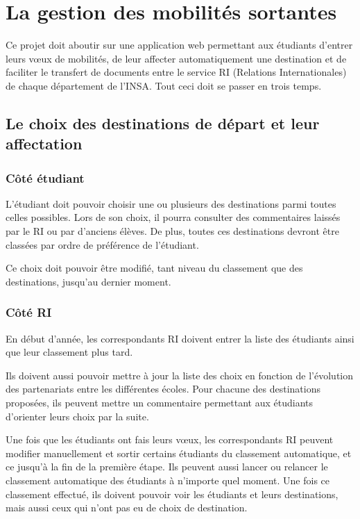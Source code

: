 
		\section{La gestion des mobilités sortantes}
		
		Ce projet doit aboutir sur une application web permettant aux étudiants d'entrer leurs vœux de mobilités, de leur affecter automatiquement une destination et de faciliter le transfert de documents entre le service RI (Relations Internationales) de chaque département de l'INSA. Tout ceci doit se passer en trois temps.
		
		 \subsection{Le choix des destinations de départ et leur affectation}
		 
		 \subsubsection{Côté étudiant}
		 
		 L'étudiant doit pouvoir choisir une ou plusieurs des destinations parmi toutes celles possibles. Lors de son choix, il pourra consulter des commentaires laissés par le RI ou par d'anciens élèves. De plus, toutes ces destinations devront être classées par ordre de préférence de l'étudiant.
		 
		 Ce choix doit pouvoir être modifié, tant niveau du classement que des destinations, jusqu'au dernier moment.
		 
		\subsubsection{Côté RI}
		
		En début d'année, les correspondants RI doivent entrer la liste des étudiants ainsi que leur classement plus tard. 
		
		Ils doivent aussi pouvoir mettre à jour la liste des choix en fonction de l'évolution des partenariats entre les différentes écoles. Pour chacune des destinations proposées, ils peuvent mettre un commentaire permettant aux étudiants d'orienter leurs choix par la suite.
		
		Une fois que les étudiants ont fais leurs vœux, les correspondants RI peuvent modifier manuellement et sortir certains étudiants du classement automatique, et ce jusqu'à la fin de la première étape. Ils peuvent aussi lancer ou relancer le classement automatique des étudiants à n'importe quel moment. Une fois ce classement effectué, ils doivent pouvoir voir les étudiants et leurs destinations, mais aussi ceux qui n'ont pas eu de choix de destination.
